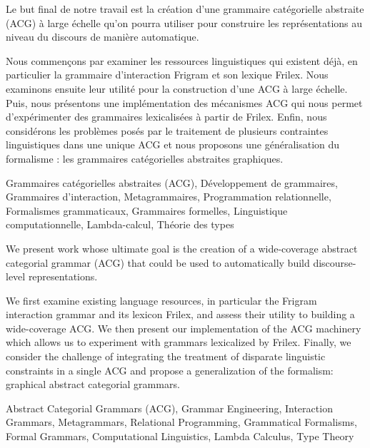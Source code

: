 \newpage


\begin{description}[style=nextline]
\item[Résumé]

Le but final de notre travail est la création d'une grammaire
catégorielle abstraite (ACG) à large échelle qu'on pourra utiliser pour
construire les représentations au niveau du discours de manière
automatique.

Nous commençons par examiner les ressources linguistiques qui existent
déjà, en particulier la grammaire d'interaction Frigram et son lexique
Frilex. Nous examinons ensuite leur utilité pour la construction d'une
ACG à large échelle. Puis, nous présentons une implémentation des
mécanismes ACG qui nous permet d'expérimenter des grammaires
lexicalisées à partir de Frilex. Enfin, nous considérons les problèmes
posés par le traitement de plusieurs contraintes linguistiques dans une
unique ACG et nous proposons une généralisation du formalisme : les
grammaires catégorielles abstraites graphiques.

\item[Mots-clés]

Grammaires catégorielles abstraites (ACG), Développement de grammaires,
Grammaires d'interaction, Metagrammaires, Programmation relationnelle,
Formalismes grammaticaux, Grammaires formelles, Linguistique
computationnelle, Lambda-calcul, Théorie des types
\end{description}

\vfill

\begin{description}[style=nextline]
\item[Summary]

We present work whose ultimate goal is the creation of a wide-coverage
abstract categorial grammar (ACG) that could be used to automatically
build discourse-level representations.

We first examine existing language resources, in particular the Frigram
interaction grammar and its lexicon Frilex, and assess their utility to
building a wide-coverage ACG. We then present our implementation of the
ACG machinery which allows us to experiment with grammars lexicalized by
Frilex. Finally, we consider the challenge of integrating the treatment
of disparate linguistic constraints in a single ACG and propose a
generalization of the formalism: graphical abstract categorial
grammars.

\item[Keywords]

Abstract Categorial Grammars (ACG), Grammar Engineering, Interaction
Grammars, Metagrammars, Relational Programming, Grammatical Formalisms,
Formal Grammars, Computational Linguistics, Lambda Calculus, Type Theory
\end{description}
